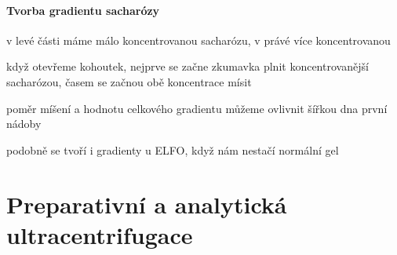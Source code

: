 \documentclass[DIV=8]{scrreprt}
\begin{document}
\paragraph{Tvorba gradientu sacharózy}
\begin{myItemize}[nosep]
    \item v levé části máme málo koncentrovanou sacharózu, v právé více koncentrovanou
    \item když otevřeme kohoutek, nejprve se začne zkumavka plnit koncentrovanější sacharózou, časem se začnou obě koncentrace mísit
\begin{myItemize}[nosep]
    \item poměr míšení a hodnotu celkového gradientu můžeme ovlivnit šířkou dna první nádoby
\end{myItemize}

    \item podobně se tvoří i gradienty u ELFO, když nám nestačí normální gel
\end{myItemize}



\section{Preparativní a analytická ultracentrifugace} \label{Preparativní a analytická ultracentrifugace} \FloatBarrier
\end{document}
